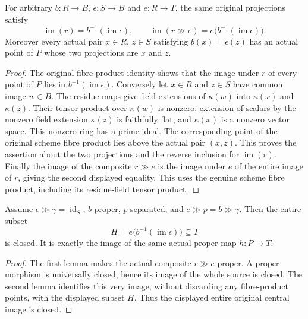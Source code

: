 \begin{lemma}
\label{lem:proper-central-fiber-entire-image}
\leanok
For arbitrary $b:R\to B$, $\epsilon:S\to B$ and $e:R\to T$, the
same original projections satisfy
\[
 \operatorname{im}(r)=b^{-1}(\operatorname{im}\epsilon),\qquad
 \operatorname{im}(r\gg e)
 =e\bigl(b^{-1}(\operatorname{im}\epsilon)\bigr).
\]
Moreover every actual pair $x\in R$, $z\in S$ satisfying
$b(x)=\epsilon(z)$ has an actual point of $P$ whose two projections
are $x$ and $z$.
\end{lemma}
\begin{proof}
The original fibre-product identity shows that the image under $r$ of
every point of $P$ lies in $b^{-1}(\operatorname{im}\epsilon)$.
Conversely let $x\in R$ and $z\in S$ have common image $w\in B$.
The residue maps give field extensions of $\kappa(w)$ into
$\kappa(x)$ and $\kappa(z)$. Their tensor product over $\kappa(w)$
is nonzero: extension of scalars by the nonzero field extension
$\kappa(z)$ is faithfully flat, and $\kappa(x)$ is a nonzero vector
space. This nonzero ring has a prime ideal. The corresponding point
of the original scheme fibre product lies above the actual pair
$(x,z)$. This proves the assertion about the two projections and the
reverse inclusion for $\operatorname{im}(r)$. Finally the image of
the composite $r\gg e$ is the image under $e$ of the entire image of
$r$, giving the second displayed equality. This uses the genuine
scheme fibre product, including its residue-field tensor product.
\end{proof}

\begin{corollary}
\label{cor:proper-central-fiber-closed-compactification-image}
\leanok
Assume $\epsilon\gg\gamma=\operatorname{id}_S$, $b$ proper,
$p$ separated, and $e\gg p=b\gg\gamma$. Then the entire subset
\[
 H=e\bigl(b^{-1}(\operatorname{im}\epsilon)\bigr)\subseteq T
\]
is closed. It is exactly the image of the same actual proper map
$h:P\to T$.
\end{corollary}
\begin{proof}
The first lemma makes the actual composite $r\gg e$ proper. A proper
morphism is universally closed, hence its image of the whole source
is closed. The second lemma identifies this very image, without
discarding any fibre-product points, with the displayed subset $H$.
Thus the displayed entire original central image is closed.
\end{proof}

